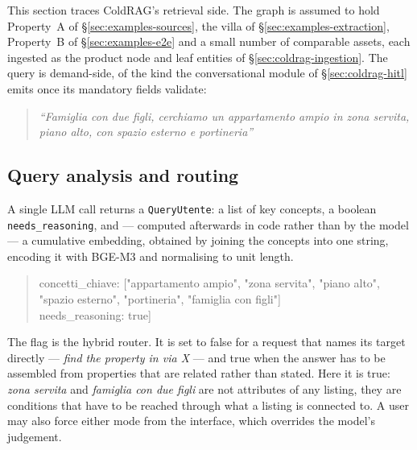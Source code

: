 This section traces ColdRAG's retrieval side. The graph is assumed to hold Property~A of \S\ref{sec:examples-sources}, the villa of \S\ref{sec:examples-extraction}, Property~B of \S\ref{sec:examples-e2e} and a small number of comparable assets, each ingested as the product node and leaf entities of \S\ref{sec:coldrag-ingestion}. The query is demand-side, of the kind the conversational module of \S\ref{sec:coldrag-hitl} emits once its mandatory fields validate:

\vspace{0.5cm}

\begin{quote}
  \footnotesize{\itshape
``Famiglia con due figli, cerchiamo un appartamento ampio in zona servita, piano alto, con spazio esterno e portineria''}
\end{quote}

\subsection{Query analysis and routing}

A single LLM call returns a \texttt{QueryUtente}: a list of key concepts, a boolean \texttt{needs\_reasoning}, and --- computed afterwards in code rather than by the model --- a cumulative embedding, obtained by joining the concepts into one string, encoding it with BGE-M3 and normalising to unit length.

\vspace{0.5cm}

\begin{quote}
  \footnotesize{\ttfamily concetti\_chiave: ["appartamento ampio", "zona servita", "piano alto",\\
\phantom{concetti\_chiave: [}"spazio esterno", "portineria", "famiglia con figli"]\\
needs\_reasoning: true]}
\end{quote}

\vspace{0.5cm}

The flag is the hybrid router. It is set to false for a request that names its target directly --- \emph{find the property in via X} --- and true when the answer has to be assembled from properties that are related rather than stated. Here it is true: \emph{zona servita} and \emph{famiglia con due figli} are not attributes of any listing, they are conditions that have to be reached through what a listing is connected to. A user may also force either mode from the interface, which overrides the model's judgement.

